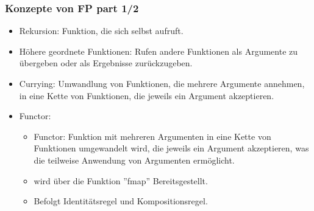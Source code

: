 \documentclass{beamer}
\begin{document}
\begin{frame}
\frametitle{Konzepte  von FP part 1/2} 
	\begin{itemize}
		\item Rekursion:   Funktion, die sich selbst aufruft.
		 \item Höhere geordnete Funktionen: Rufen andere Funktionen als Argumente zu übergeben oder als Ergebnisse zurückzugeben.
		\item Currying: Umwandlung von Funktionen, die mehrere Argumente annehmen, in eine Kette von Funktionen, die jeweils ein Argument akzeptieren.
			\item Functor: \begin{itemize}
			    \item Functor: Funktion mit mehreren Argumenten in eine Kette von Funktionen umgewandelt wird, die jeweils ein Argument akzeptieren, was die teilweise Anwendung von Argumenten ermöglicht. 
			    \item wird über die Funktion ''fmap'' Bereitsgestellt.
                   \item  Befolgt Identitätsregel und Kompositionsregel.
			\end{itemize}
	\end{itemize}
\end{frame}
\end{document}
